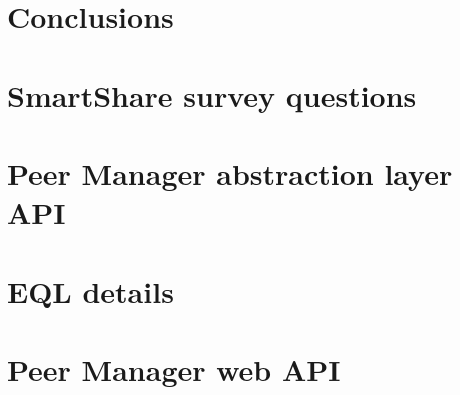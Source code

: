 \documentclass{SmartReport}
\begin{document}
\section{Conclusions}
\label{sec:concl}

\newpage



\clearpage
\appendix
\section{SmartShare survey questions} \label{sec:smartshare-survey}


\newpage
\section{Peer Manager abstraction layer API} \label{sec:pm-abs-api-detail}


\newpage
\section{EQL details} \label{sec:search-annex}


\newpage
\section{Peer Manager web API} \label{sec:pm-web-api-detail}

\end{document}
